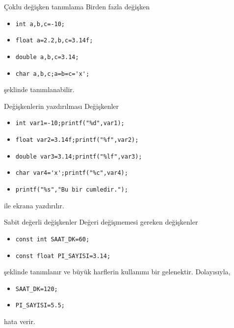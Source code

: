 \begin{frame}[fragile]{Çoklu değişken tanımlama}
    Birden fazla değişken
    \begin{itemize}
        \item \lstinline{int a,b,c=-10;} 
        \item \lstinline{float a=2.2,b,c=3.14f;} 
        \item \lstinline{double a,b,c=3.14;} 
        \item \lstinline{char a,b,c;a=b=c='x';}
    \end{itemize}
    şeklinde tanımlanabilir.
\end{frame}
\begin{frame}[fragile]{Değişkenlerin yazdırılması}
    Değişkenler
    \begin{itemize}
        \item \lstinline{int var1=-10;printf("%d",var1);} 
        \item \lstinline{float var2=3.14f;printf("%f",var2);} 
        \item \lstinline{double var3=3.14;printf("%lf",var3);} 
        \item \lstinline{char var4='x';printf("%c",var4);}
        \item \lstinline{printf("%s","Bu bir cumledir.");}
    \end{itemize}
    ile ekrana yazdırılır.
\end{frame}
\begin{frame}[fragile]{Sabit değerli değişkenler}
    Değeri değişmemesi gereken değişkenler
    \begin{itemize}
        \item \lstinline{const int SAAT_DK=60;} 
        \item \lstinline{const float PI_SAYISI=3.14;} 
    \end{itemize}
    şeklinde tanımlanır ve büyük harflerin kullanımı bir gelenektir. Dolayısıyla,
    \begin{itemize}
        \item \lstinline{SAAT_DK=120;} 
        \item \lstinline{PI_SAYISI=5.5;} 
    \end{itemize}
    hata verir.
\end{frame}
